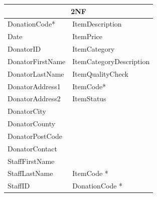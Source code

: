 \begin{center}
\begin{tabular}{|p{4.5cm}|p{4.5cm}|}
\hline
\multicolumn{2}{|c|}{2NF}                                       \\ \hline
DonationCode*     & \multicolumn{1}{l|}{ItemDescription}         \\
Date             & \multicolumn{1}{l|}{ItemPrice}               \\
DonatorID        & \multicolumn{1}{l|}{ItemCategory}            \\
DonatorFirstName & \multicolumn{1}{l|}{ItemCategoryDescription} \\
DonatorLastName  & \multicolumn{1}{l|}{ItemQualityCheck}        \\
DonatorAddress1  & \multicolumn{1}{l|}{ItemCode*}                \\
DonatorAddress2  & \multicolumn{1}{l|}{ItemStatus}              \\
DonatorCity      & \multicolumn{1}{l|}{}                        \\ \cline{2-2} 
DonatorCounty    &                                              \\
DonatorPostCode  &                                              \\
DonatorContact   &                                              \\
StaffFirstName   &                                              \\ \cline{2-2} 
StaffLastName    & \multicolumn{1}{l|}{ItemCode *}                \\
StaffID          & \multicolumn{1}{l|}{DonationCode *}            \\ \hline
\end{tabular}
\end{center}


